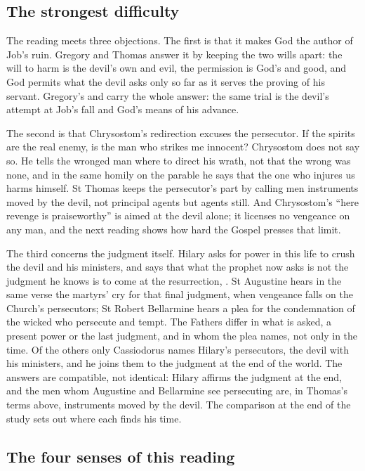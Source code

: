 \subsection{The strongest difficulty}

The reading meets three objections. The first is that it makes God the author of
Job's ruin. Gregory and Thomas answer it by keeping the two wills apart: the
will to harm is the devil's own and evil, the permission is God's and good, and
God permits what the devil asks only so far as it serves the proving of his
servant. Gregory's  and  carry the whole
answer: the same trial is the devil's attempt at Job's fall and God's means of his
advance.

The second is that Chrysostom's redirection excuses the persecutor. If the
spirits are the real enemy, is the man who strikes me innocent? Chrysostom does
not say so. He tells the wronged man where to direct his wrath, not that the
wrong was none, and in the same homily on the parable he says that the one who
injures us harms himself. St Thomas keeps the persecutor's part by calling men
instruments moved by the devil, not principal agents but agents still. And
Chrysostom's ``here revenge is praiseworthy'' is aimed at the devil alone; it
licenses no vengeance on any man, and the next reading shows how hard the Gospel
presses that limit.

The third concerns the judgment itself. Hilary asks for power in this life to
crush the devil and his ministers, and says that what the prophet now asks is not
the judgment he knows is to come at the resurrection, . St Augustine hears in the same verse
the martyrs' cry for that final judgment, when vengeance falls on the Church's
persecutors; St Robert Bellarmine hears a plea for the condemnation of the wicked
who persecute and tempt. The Fathers differ in what is asked, a present power or
the last judgment, and in whom the plea names, not only in the time. Of the
others only Cassiodorus names Hilary's persecutors, the devil with his ministers,
and he joins them to the judgment at the end of the world. The answers are
compatible, not identical: Hilary affirms the judgment at the end, and the men
whom Augustine and Bellarmine see persecuting are, in Thomas's terms above,
instruments moved by the devil. The comparison at the end of the study sets out
where each finds his time.

\subsection{The four senses of this reading}


